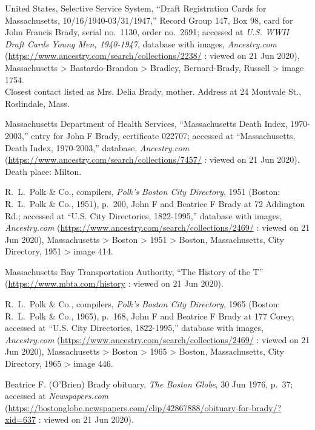 \begin{thebibliography}{999}
	United States, Selective Service System, ``Draft Registration Cards for Massachusetts, 10/16/1940-03/31/1947,'' Record Group 147, Box 98, card for John Francis Brady, serial no.\ 1130, order no.\ 2691; accessed at \textit{U.S. WWII Draft Cards Young Men, 1940-1947}, database with images, \textit{Ancestry.com} (\url{https://www.ancestry.com/search/collections/2238/} : viewed on 21 Jun 2020), Massachusetts >  Bastardo-Brandon > Bradley, Bernard-Brady, Russell > image 1754.\\
	Closest contact listed as Mrs. Delia Brady, mother. Address at 24 Montvale St., Roslindale, Mass.
	
	Massachusetts Department of Health Services, ``Massachusetts Death Index, 1970-2003,'' entry for John F Brady, certificate 022707; accessed at ``Massachusetts, Death Index, 1970-2003,'' database, \textit{Ancestry.com} (\url{https://www.ancestry.com/search/collections/7457/} : viewed on 21 Jun 2020).\\
	Death place: Milton.
	
	R.\ L.\ Polk \& Co., compilers, \textit{Polk's Boston City Directory}, 1951 (Boston: R.\ L.\ Polk \& Co., 1951), p.\ 200, John F and Beatrice F Brady at 72 Addington Rd.; accessed at ``U.S. City Directories, 1822-1995,'' database with images, \textit{Ancestry.com} (\url{https://www.ancestry.com/search/collections/2469/} : viewed on 21 Jun 2020), Massachusetts > Boston > 1951 > Boston, Massachusetts, City Directory, 1951 > image 414.
	
	Massachusetts Bay Transportation Authority, ``The History of the T'' (\url{https://www.mbta.com/history} : viewed on 21 Jun 2020).
	
	R.\ L.\ Polk \& Co., compilers, \textit{Polk's Boston City Directory}, 1965 (Boston: R.\ L.\ Polk \& Co., 1965), p.\ 168, John F and Beatrice F Brady at 177 Corey; accessed at ``U.S. City Directories, 1822-1995,'' database with images, \textit{Ancestry.com} (\url{https://www.ancestry.com/search/collections/2469/} : viewed on 21 Jun 2020), Massachusetts > Boston > 1965 > Boston, Massachusetts, City Directory, 1965 > image 446.
	
	Beatrice F. (O'Brien) Brady obituary, \textit{The Boston Globe}, 30 Jun 1976, p.\ 37; accessed at \textit{Newspapers.com} (\url{https://bostonglobe.newspapers.com/clip/42867888/obituary-for-brady/?xid=637} : viewed on 21 Jun 2020).
	

\end{thebibliography}
